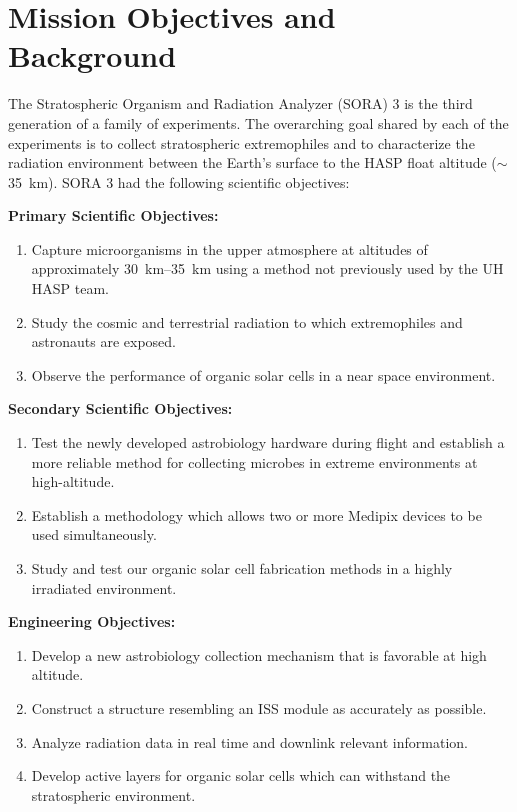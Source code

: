\section{Mission Objectives and Background}
\label{sec:Introduction}
\newcommand{\indentitem}{\setlength\itemindent{25pt}}%

The Stratospheric Organism and Radiation Analyzer (SORA) 3 is the third generation of a family of experiments.
The overarching goal shared by each of the experiments is to collect stratospheric extremophiles and to characterize the radiation environment between the Earth's surface to the HASP float altitude ($\sim$\SI{35}{\kilo\meter}).
SORA 3 had the following scientific objectives:

\vspace{0.5cm}
\noindent \textbf {Primary Scientific Objectives:}
\begin{enumerate}
\item Capture microorganisms in the upper atmosphere at altitudes of approximately \SIrange{30}{35}{\kilo\meter} using a method not previously used by the UH HASP team. 
\item Study the cosmic and terrestrial radiation to which extremophiles and astronauts are exposed.
\item Observe the performance of organic solar cells in a near space environment.
\end{enumerate}

\vspace{0.5cm}
\noindent \textbf {Secondary Scientific Objectives:}
\begin{enumerate}
\item Test the newly developed astrobiology hardware during flight and establish a more reliable method for collecting microbes in extreme environments at high-altitude.
\item Establish a methodology which allows two or more Medipix devices to be used simultaneously.
\item Study and test our organic solar cell fabrication methods in a highly irradiated environment.
\end{enumerate}

\vspace{0.5cm}
\noindent \textbf {Engineering Objectives:}
\begin{enumerate}
\item Develop a new astrobiology collection mechanism that is favorable at high altitude.
\item Construct a structure resembling an ISS module as accurately as possible.
\item Analyze radiation data in real time and downlink relevant information.
\item Develop active layers for organic solar cells which can withstand the stratospheric environment.
\end{enumerate}

